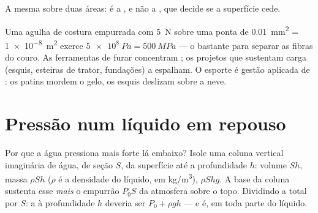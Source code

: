 \begin{omfigure}
\qquad
{}

{\small A mesma  sobre duas áreas: é a , e não a , que
decide se a superfície cede.}
\end{omfigure}

\begin{remark}\label{rem:g10:pressure:tools}
Uma agulha de costura empurrada com \qty{5}{N} sobre uma ponta de
\qty{0.01}{mm^2} = \qty{1e-8}{m^2} exerce
$\qty{5e8}{Pa} = \qty{500}{MPa}$ --- o bastante para separar as fibras do
couro. As ferramentas de furar concentram ; os projetos que
sustentam carga (esquis, esteiras de trator, fundações) a espalham. O
esporte é gestão aplicada de : os patins mordem o gelo, os esquis
deslizam sobre a neve.
\end{remark}

\section{Pressão num líquido em repouso}

Por que a água pressiona mais forte lá embaixo? Isole uma coluna vertical
imaginária de água, de seção $S$, da superfície até a profundidade $h$:
volume $Sh$, massa $\rho S h$ ($\rho$ é a densidade do líquido, em
\unit{kg/m^3}),  $\rho S h g$. A base da coluna sustenta esse 
\emph{mais} o empurrão $P_0 S$ da atmosfera sobre o topo. Dividindo a
 total por $S$: a  à profundidade $h$ deveria ser
$P_0 + \rho g h$ --- e é, em toda parte do líquido.

